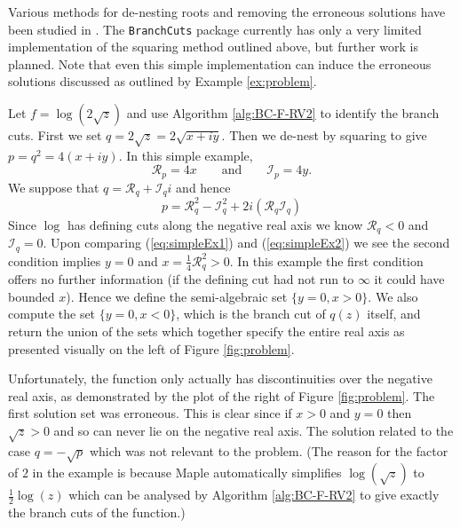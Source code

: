 \documentclass{llncs}
\begin{document}
Various methods for de-nesting roots and removing the erroneous solutions have been studied in
\cite{BBDP04, BPB05, BBDP07, Phisanbut11}.  
The \texttt{BranchCuts} package currently has only a very limited implementation of the squaring method outlined above, but further work is planned.  Note that even this simple implementation can induce the erroneous solutions discussed as outlined by Example \ref{ex:problem}.

\begin{example} \label{ex:problem}
Let $f=\log(2\sqrt{z})$ and use Algorithm \ref{alg:BC-F-RV2} to identify the branch cuts.  First we set $q=2\sqrt{z}=2\sqrt{x+iy}$.  Then we de-nest by squaring to give $p=q^2=4(x+iy)$.  In this simple example, 
\begin{equation} 
\label{eq:simpleEx1}
\mathcal{R}_p=4x \qquad \mbox{and} \qquad \mathcal{I}_p=4y.
\end{equation}
We suppose that $q = \mathcal{R}_q+\mathcal{I}_q i$ and hence
\begin{equation}
\label{eq:simpleEx2}
p = \mathcal{R}_q^2-\mathcal{I}_q^2 + 2i(\mathcal{R}_q\mathcal{I}_q)
\end{equation}
Since $\log$ has defining cuts along the negative real axis we know $\mathcal{R}_q<0$ and $\mathcal{I}_q=0$.  Upon comparing (\ref{eq:simpleEx1}) and  (\ref{eq:simpleEx2}) we see the second condition implies $y=0$ and $x=\frac{1}{4}\mathcal{R}_q^2 >0$.  In this example the first condition offers no further information (if the defining cut had not run to $\infty$ it could have bounded $x$).  Hence we define the semi-algebraic set $\{y=0, x>0\}$.  
We also compute the set $\{y=0, x<0\}$, which is the branch cut of $q(z)$ itself, and return the union of the sets which together specify the entire real axis as presented visually on the left of Figure \ref{fig:problem}.  

Unfortunately, the function only actually has discontinuities over the negative real axis, as demonstrated by the plot of the right of Figure \ref{fig:problem}.  The first solution set was erroneous.  This is clear since if $x>0$ and $y=0$ then $\sqrt{z}>0$ and so can never lie on the negative real axis.  The solution related to the case $q=-\sqrt{p}$ which was not relevant to the problem.  
(The reason for the factor of $2$ in the example is because {\sc Maple} automatically simplifies $\log(\sqrt{z})$ to $\frac{1}{2}\log(z)$ which can be analysed by Algorithm \ref{alg:BC-F-RV2} to give exactly the branch cuts of the function.)
\end{example}
\end{document}
